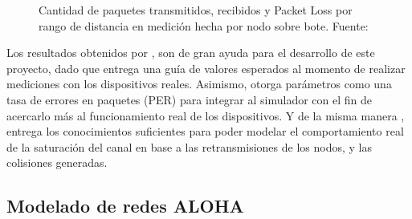 \begin{justify}
\begin{figure}[!ht]
\caption{Cantidad de paquetes transmitidos, recibidos y Packet Loss por rango de distancia en medición hecha por nodo sobre bote. Fuente:\cite{Juha}}
\label{arte:4}
\end{figure}
Los resultados obtenidos por \cite{Juha}, son de gran ayuda para el desarrollo de este proyecto, dado que entrega una guía de valores esperados al momento de realizar mediciones con los dispositivos reales. Asimismo, otorga parámetros como una tasa de errores en paquetes (PER) para integrar al simulador con el fin de acercarlo más al funcionamiento real de los dispositivos. Y de la misma manera \cite{Xavier}, entrega los conocimientos suficientes para poder modelar el comportamiento real de la saturación del canal en base a las retransmisiones de los nodos, y las colisiones generadas.
\subsection{Modelado de redes ALOHA}


\end{justify}
